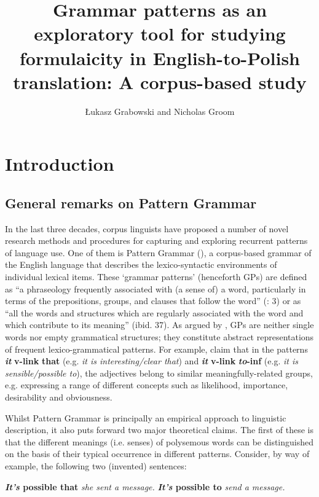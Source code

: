 \documentclass[output=paper]{langscibook}
\author{Łukasz Grabowski\affiliation{University of Opole}\orcid{} and Nicholas Groom\affiliation{University of Birmingham}}
\title[Grammar patterns as a tool for studying formulaicity in Eng-Pol translation]{Grammar patterns as an exploratory tool for studying formulaicity in English-to-Polish translation: A corpus-based study }
\begin{document}
\maketitle 

\section{Introduction}
\subsection{General remarks on Pattern Grammar}

In the last three decades, corpus linguists have proposed a number of novel research methods and procedures for capturing and exploring recurrent patterns of language use. One of them is Pattern Grammar (\citealt{HunstonFrancis2000}), a corpus-based grammar of the English language that describes the lexico-syntactic environments of individual lexical items. These ‘grammar patterns’ (henceforth GPs) are defined as “a phraseology frequently associated with (a sense of) a word, particularly in terms of the prepositions, groups, and clauses that follow the word” (\citealt{HunstonFrancis2000}: 3) or as “all the words and structures which are regularly associated with the word and which contribute to its meaning” (ibid. 37). As argued by \citet[142]{Römer2009}, GPs are neither single words nor empty grammatical structures; they constitute abstract representations of frequent lexico-grammatical patterns. For example, \citet[29]{HunstonFrancis2000} claim that in the patterns \textbf{\textit{it} }\textbf{v-link} \textbf{{\ADJ}} \textbf{that} (e.g. \textit{it is interesting/clear that})  and \textbf{\textit{it} }\textbf{v-link} \textbf{{\ADJ}} \textbf{\textit{to}}\textbf{{}-inf} (e.g. \textit{it is sensible/possible to}), the adjectives belong to similar meaningfully-related groups, e.g. expressing a range of different concepts such as likelihood, importance, desirability and obviousness.

Whilst Pattern Grammar is principally an empirical approach to linguistic description, it also puts forward two major theoretical claims. The first of these is that the different meanings (i.e. senses) of polysemous words can be distinguished on the basis of their typical occurrence in different patterns. Consider, by way of example, the following two (invented) sentences: 

\ea \textbf{\textit{It’s} \textbf{possible} \textbf{that}} \textit{she sent a message.} \label{ex:grabowski:1}
\ex \textbf{\textit{It’s} \textbf{possible} \textbf{to}} \textit{send a message.} \label{ex:grabowski:2}
\z
\end{document}
